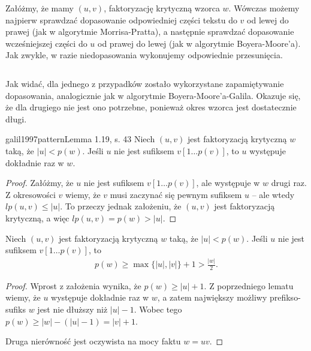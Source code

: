 Załóżmy, że mamy $(u, v)$, faktoryzację krytyczną wzorca $w$. Wówczas możemy najpierw sprawdzać dopasowanie odpowiedniej części tekstu do $v$ od lewej do prawej (jak w algorytmie Morrisa-Pratta), a następnie sprawdzać dopasowanie wcześniejszej części do $u$ od prawej do lewej (jak w algorytmie Boyera-Moore'a). Jak zwykle, w razie niedopasowania wykonujemy odpowiednie przesunięcia.

\begin{code}
\inputminted{python}{code/exact-string-matching/two-way.py}
\label{alg:exact-string-matching-two-way}
\end{code}

Jak widać, dla jednego z przypadków zostało wykorzystane zapamiętywanie dopasowania, analogicznie jak w algorytmie Boyera-Moore'a-Galila.
Okazuje się, że dla drugiego nie jest ono potrzebne, ponieważ okres wzorca jest dostatecznie długi.

\begin{lemma}{galil1997pattern}{Lemma 1.19, s. 43}
  Niech $(u, v)$ jest faktoryzacją krytyczną $w$ taką, że $|u| < p(w)$. Jeśli $u$ nie jest sufiksem $v[1 \ldots p(v)]$, to $u$ występuje dokładnie raz w $w$.
\end{lemma}

\begin{proof}
  Załóżmy, że $u$ nie jest sufiksem $v[1 \ldots p(v)]$, ale występuje w $w$ drugi raz.
  Z okresowości $v$ wiemy, że $v$ musi zaczynać się pewnym sufiksem $u$ -- ale wtedy $lp(u, v) \le |u|$.
  To przeczy jednak założeniu, że $(u, v)$ jest faktoryzacją krytyczną, a więc $lp(u, v) = p(w) > |u|$.
\end{proof}

\begin{corollary}{}{}
  \label{col:long-period}
  Niech $(u, v)$ jest faktoryzacją krytyczną $w$ taką, że $|u| < p(w)$. Jeśli $u$ nie jest sufiksem $v[1 \ldots p(v)]$, to
  \begin{align*}
    p(w) \ge \max\{|u|, |v|\} + 1 > \frac{|w|}{2}.
  \end{align*}
\end{corollary}

\begin{proof}
  Wprost z założenia wynika, że $p(w) \ge |u| + 1$.
  Z poprzedniego lematu wiemy, że $u$ występuje dokładnie raz w $w$, a zatem największy możliwy prefikso-sufiks $w$ jest nie dłuższy niż $|u| - 1$.
  Wobec tego $p(w) \ge |w| - (|u| - 1) = |v| + 1$.
  
  Druga nierówność jest oczywista na mocy faktu $w = uv$.
\end{proof}

